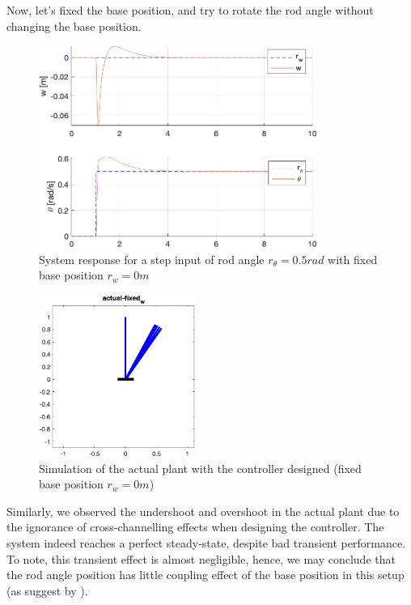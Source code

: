 \documentclass{tron}
\begin{document}
\clearpage
Now, let's fixed the base position, and try to rotate the rod angle without changing the base position.
\begin{figure}[H]
	\centering
	\includegraphics[height=250px]{../matlab/output/p5/square_response_actual-fixed_w}
	\caption{System response for a step input of rod angle $r_{\theta}=0.5\unit{rad}$ with fixed base position $r_{w}=0\unit{m}$}
	\label{fig:p5:P3_aug:sim:fixe-w}
\end{figure}
\begin{figure}[H]
	\centering
	\includegraphics[height=200px]{../matlab/output/p5/mimo_sim_actual-fixed_w}
	\caption{Simulation of the actual plant with the controller designed (fixed base position $r_{w}=0\unit{m}$)}
	\label{fig:p5:P3_aug:sim:fixe-w}
\end{figure}
Similarly, we observed the undershoot and overshoot in the actual plant due to the ignorance of cross-channelling effects when designing the controller. The system indeed reaches a perfect steady-state, despite bad transient performance. To note, this transient effect is almost negligible, hence, we may conclude that the rod angle position has little coupling effect of the base position in this setup (as suggest by ).
\end{document}
